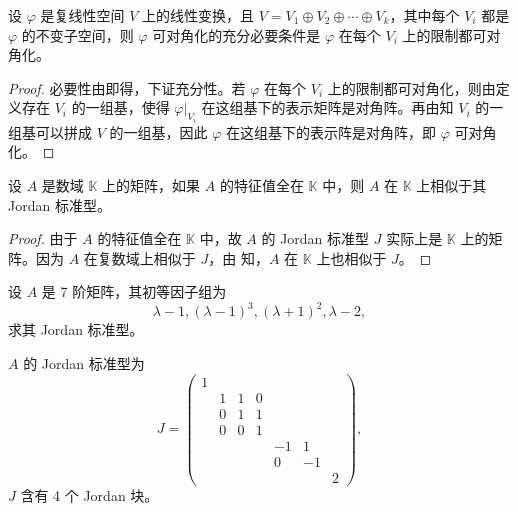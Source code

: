 \documentclass[../../main.tex]{subfiles}%
\begin{document}
\begin{corollary}\label{corollary:线性变换可对角化关于在直和分解限制的充要条件}
设 $\varphi$ 是复线性空间 $V$ 上的线性变换，且 $V = V_1\oplus V_2\oplus\cdots\oplus V_k$，其中每个 $V_i$ 都是 $\varphi$ 的不变子空间，则 $\varphi$ 可对角化的充分必要条件是 $\varphi$ 在每个 $V_i$ 上的限制都可对角化。
\end{corollary}
\begin{proof}
必要性由即得，下证充分性。若 $\varphi$ 在每个 $V_i$ 上的限制都可对角化，则由定义存在 $V_i$ 的一组基，使得 $\varphi|_{V_i}$ 在这组基下的表示矩阵是对角阵。再由知 $V_i$ 的一组基可以拼成 $V$ 的一组基，因此 $\varphi$ 在这组基下的表示阵是对角阵，即 $\varphi$ 可对角化。
\end{proof}

\begin{corollary}
设 $A$ 是数域 $\mathbb{K}$ 上的矩阵，如果 $A$ 的特征值全在 $\mathbb{K}$ 中，则 $A$ 在 $\mathbb{K}$ 上相似于其 Jordan 标准型。
\end{corollary}
\begin{proof}
由于 $A$ 的特征值全在 $\mathbb{K}$ 中，故 $A$ 的 Jordan 标准型 $J$ 实际上是 $\mathbb{K}$ 上的矩阵。因为 $A$ 在复数域上相似于 $J$，由 知，$A$ 在 $\mathbb{K}$ 上也相似于 $J$。
\end{proof}

\begin{example}
设 $A$ 是 7 阶矩阵，其初等因子组为
\[
\lambda - 1, (\lambda - 1)^3, (\lambda + 1)^2, \lambda - 2,
\]
求其 Jordan 标准型。
\end{example}
\begin{solution}
$A$ 的 Jordan 标准型为
\[
J = \begin{pmatrix}
1 & & & & & & \\
& 1 & 1 & 0 & & & \\
& 0 & 1 & 1 & & & \\
& 0 & 0 & 1 & & & \\
& & & & -1 & 1 & \\
& & & & 0 & -1 & \\
& & & & & & 2
\end{pmatrix},
\]
$J$ 含有 4 个 Jordan 块。

\end{solution}
\end{document}
